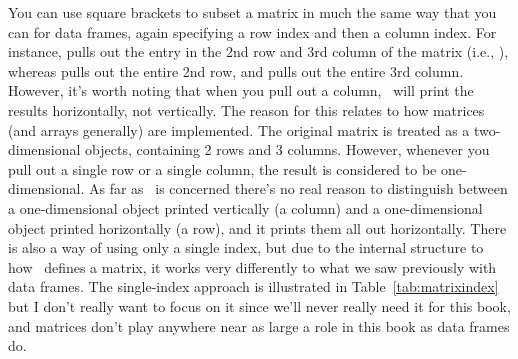 You can use square brackets to subset a matrix in much the same way that you can for data frames, again specifying a row index and then a column index. For instance,  pulls out the entry in the 2nd row and 3rd column of the matrix (i.e., ), whereas  pulls out the entire 2nd row, and  pulls out the entire 3rd column. However, it's worth noting that when you pull out a column, \R\ will print the results horizontally, not vertically. The reason for this relates to how matrices (and arrays generally) are implemented. The original matrix  is treated as a two-dimensional objects, containing 2 rows and 3 columns. However, whenever you pull out a single row or a single column, the result is considered to be one-dimensional. As far as \R\ is concerned there's no real reason to distinguish between a one-dimensional object printed vertically (a column) and a one-dimensional object printed horizontally (a row), and it prints them all out horizontally. There is also a way of using only a single index, but due to the internal structure to how \R\ defines a matrix, it works very differently to what we saw previously with data frames. The single-index approach is illustrated in Table~\ref{tab:matrixindex} but I don't really want to focus on it since we'll never really need it for this book, and matrices don't play anywhere near as large a role in this book as data frames do.

